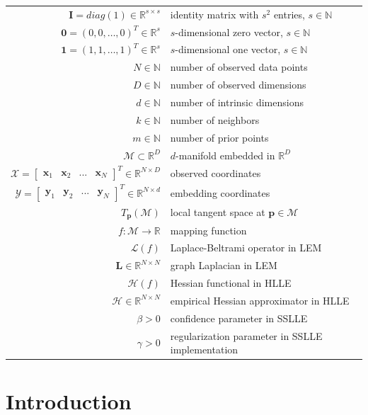 \documentclass[12pt, t]{article}
\newcommand{\mani}{\mathcal{M}}
\newcommand{\N}{\mathbb{N}}
\newcommand{\R}{\mathbb{R}}
\newcommand{\RD}{\mathbb{R}^D}
\newcommand{\X}{\mathcal{X}}
\newcommand{\x}{\bm{x}}
\newcommand{\Y}{\mathcal{Y}}
\newcommand{\y}{\bm{y}}
\newcommand{\pv}{\bm{p}}
\newcommand{\I}{\bm{I}}
\newcommand{\Lap}{\bm{L}}
\begin{document}
\begin{tabular}{rl}
  $\I = \mathit{diag}(1) \in \R^{s \times s}$ & identity matrix with $s^2$ 
  entries, $s \in \N$ \\
  $\bm{0} = (0, 0, \dots, 0)^T \in \R^s$ & $s$-dimensional zero vector, 
  $s \in \N$ \\
  $\bm{1} = (1, 1, \dots, 1)^T \in \R^s$ & $s$-dimensional one vector, 
  $s \in \N$ \\
  $N \in \N$ & number of observed data points \\
  $D \in \N$ & number of observed dimensions \\
  $d \in \N$ & number of intrinsic dimensions\\
  $k \in \N$ & number of neighbors \\
  $m \in \N$ & number of prior points \\
  $\mani \subset \RD$ & $d$-manifold embedded in $\RD$ \\
  $\X = \begin{bmatrix} \x_1 & \x_2 & ... & \x_N \end{bmatrix}^T 
  \in \R^{N \times D}$ & observed coordinates \\
  $\Y = \begin{bmatrix} \y_1 & \y_2 & ... & \y_N \end{bmatrix}^T 
  \in \R^{N \times d}$ & embedding coordinates \\
  $T_{\pv}(\mani)$ & local tangent space at $\pv \in \mani$ \\
  $f: \mani \rightarrow \R$ & mapping function \\
  $\mathcal{L}(f)$ & Laplace-Beltrami operator in LEM \\
  $\Lap\in \R^{N \times N}$ & graph Laplacian in LEM \\
  $\mathscr{H}(f)$ & Hessian functional in HLLE \\
  $\mathcal{H} \in \R^{N \times N}$ & empirical Hessian approximator in HLLE \\
  $\beta > 0$ & confidence parameter in SSLLE \\
  $\gamma > 0$ & regularization parameter in SSLLE implementation
\end{tabular}

\newpage


    
\section{Introduction}
\label{intro}

\end{document}
